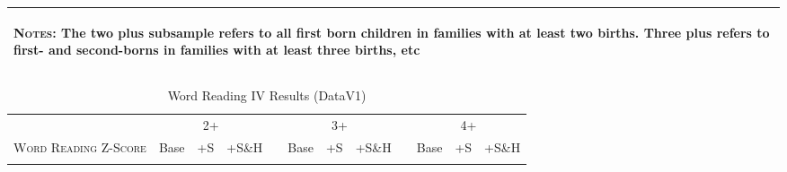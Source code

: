 \begin{landscape}
\begin{table}[htpb!]
\begin{center}
\begin{tabular}{lcccp{2mm}cccp{2mm}ccc}
\midrule\multicolumn{12}{p{19.2cm}}{\begin{footnotesize}\textsc{Notes:} The two plus subsample refers to all first born children in families with at least two births.  Three plus refers to first- and second-borns in families with at least three births, etc\end{footnotesize}} \\ \bottomrule 
\end{tabular}\end{center}\end{table}\end{landscape}\begin{landscape}\begin{table}[htpb!]\caption{Word Reading IV Results (DataV1)}
\label{TWINtab:IVAll}
\begin{center}\begin{tabular}{lcccp{2mm}cccp{2mm}ccc}
\toprule \toprule 
&\multicolumn{3}{c}{2+}&&\multicolumn{3}{c}{3+}&&\multicolumn{3}{c}{4+}\\ \cmidrule(r){2-4} \cmidrule(r){6-8} \cmidrule(r){10-12} 
\textsc{Word Reading Z-Score}&Base&+S&+S\&H&&Base&+S&+S\&H&&Base&+S&+S\&H\\ \midrule 
\begin{footnotesize}\end{footnotesize}& 
\begin{footnotesize}\end{footnotesize}& 
\begin{footnotesize}\end{footnotesize}& 
\begin{footnotesize}\end{footnotesize}& 
\begin{footnotesize}\end{footnotesize}& 
\begin{footnotesize}\end{footnotesize}& 
\begin{footnotesize}\end{footnotesize}& 
\begin{footnotesize}\end{footnotesize}& 
\begin{footnotesize}\end{footnotesize}& 
\begin{footnotesize}\end{footnotesize}& 
\begin{footnotesize}\end{footnotesize}& 
\begin{footnotesize}\end{footnotesize}\\ 

\end{tabular}
\end{center}
\end{table}
\end{landscape}
